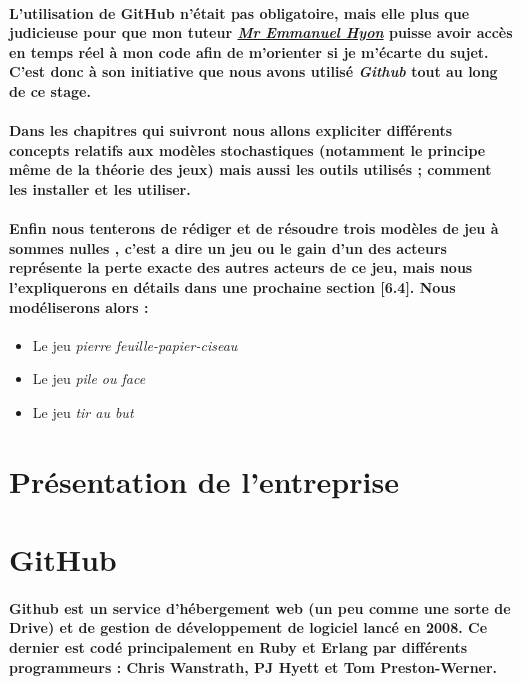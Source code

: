 \documentclass[a4paper, 12pt, twoside]{article}
\begin{document}
\paragraph{L'utilisation de GitHub n'était pas obligatoire, mais elle plus que judicieuse pour que mon tuteur \underline{\textit{Mr Emmanuel Hyon}} puisse avoir accès en temps réel à mon code afin de m'orienter si je m'écarte du sujet. C'est donc à son initiative que nous avons utilisé \textit{Github} tout au long de ce stage.}
\paragraph{Dans les chapitres qui suivront nous allons expliciter différents concepts relatifs aux modèles stochastiques (notamment le principe même de la théorie des jeux) mais aussi les outils utilisés ; comment les installer et les utiliser. }
\paragraph{Enfin nous tenterons de rédiger et de résoudre trois modèles de jeu à sommes nulles , c'est a dire un jeu ou le gain d'un des acteurs représente la perte exacte des autres acteurs de ce jeu, mais nous l'expliquerons en détails dans une prochaine section [6.4]. Nous modéliserons alors :\vspace{0.3cm}}
\begin{itemize}
\item Le jeu \textit{pierre feuille-papier-ciseau}
\item Le jeu \textit{pile ou face}
\item Le jeu \textit{tir au but}
\end{itemize}

\section{Présentation de l'entreprise}


\section{GitHub}
\paragraph{Github est un service d'hébergement web (un peu comme une sorte de Drive) et de gestion de développement de logiciel lancé en 2008.
Ce dernier est codé principalement en Ruby et Erlang par différents programmeurs : Chris Wanstrath, PJ Hyett et Tom Preston-Werner.}
\end{document}
